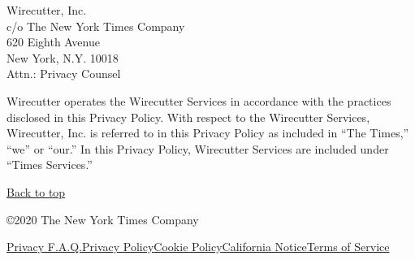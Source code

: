 Wirecutter, Inc.\\
c/o The New York Times Company\\
620 Eighth Avenue\\
New York, N.Y. 10018\\
Attn.: Privacy Counsel

Wirecutter operates the Wirecutter Services in accordance with the
practices disclosed in this Privacy Policy. With respect to the
Wirecutter Services, Wirecutter, Inc. is referred to in this Privacy
Policy as included in ``The Times,'' ``we'' or ``our.'' In this Privacy
Policy, Wirecutter Services are included under ``Times Services.''

\href{app}{Back to top}

©2020 The New York Times Company

\href{/privacy}{Privacy F.A.Q.}\href{/privacy/privacy-policy}{Privacy
Policy}\href{/privacy/cookie-policy}{Cookie
Policy}\href{/privacy/california-notice}{California
Notice}\href{https://help.nytimes3xbfgragh.onion/hc/en-us/articles/115014893428-Terms-of-service}{Terms
of Service}
